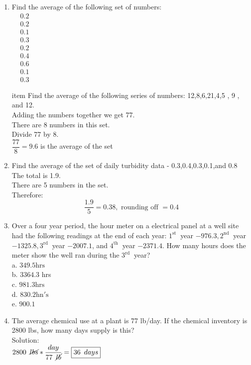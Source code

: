 \documentclass{article}
\begin{document}
\begin{enumerate}
\item Find the average of the following set of numbers:\\
$
\begin{aligned}
&0.2 \\
&0.2 \\
&0.1 \\
&0.3 \\
&0.2 \\
&0.4 \\
&0.6 \\
&0.1 \\
&0.3
\end{aligned}
$

item Find the average of the following series of numbers: 12,8,6,21,4,5 , 9 , and 12.\\
Adding the numbers together we get 77.\\
There are 8 numbers in this set.\\
Divide 77 by 8.\\

$\dfrac{77}{8}=9.6$ is the average of the set\\

\item Find the average of the set of daily turbidity data - 0.3,0.4,0.3,0.1,and 0.8\\
The total is 1.9.\\
There are 5 numbers in the set.\\
Therefore:
$$
\dfrac{1.9}{5}=0.38, \text { rounding off }=0.4
$$

\item Over a four year period, the hour meter on a electrical panel at a well site had the following readings at the end of each year: $1^{\text {st }}$ year $-976.3,2^{\text {nd }}$ year $-1325.8,3^{\text {rd }}$ year $-2007.1$, and $4^{\text {th }}$ year $-2371.4$. How many hours does the meter show the well ran during the $3^{\text {rd }}$ year?\\
a. $349.5 \mathrm{hrs}$\\
b. $3364.3$ hrs\\
c. $981.3 \mathrm{hrs}$\\
d.  $830.2 \mathrm{hn \prime s}$\\
e. $900.1$\\

\item The average chemical use at a plant is 77 lb/day. If the chemical inventory is 2800 lbs, how many days supply is this?\\
Solution:\\
$2800 \enspace \cancel{lbs} * \dfrac{day}{77 \enspace \cancel{lb}}=\boxed{36 \enspace days}$\\


\end{enumerate}
\end{document}

